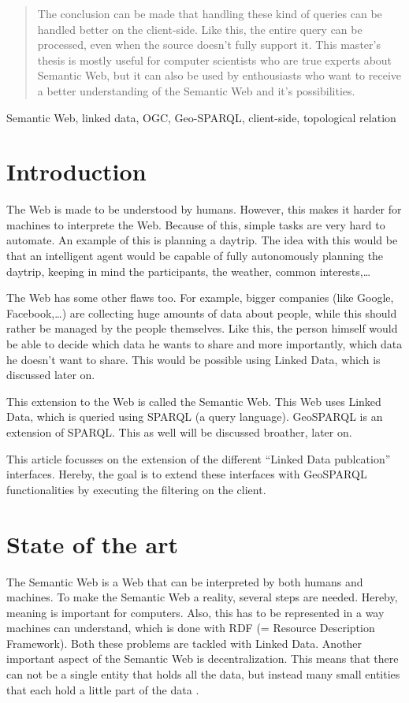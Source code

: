 \documentclass[twocolumn]{phdsymp} %
\begin{document}
\begin{abstract}
    The conclusion can be made that handling these kind of queries can be handled better on the client-side. Like this, the entire query can be processed, even when the source doesn't fully support it. This master's thesis is mostly useful for computer scientists who are true experts about Semantic Web, but it can also be used by enthousiasts who want to receive a better understanding of the Semantic Web and it's possibilities.
\end{abstract}

\begin{keywords}
    Semantic Web, linked data, OGC, Geo-SPARQL, client-side, topological relation
\end{keywords}

\section{Introduction}
The Web is made to be understood by humans. However, this makes it harder for machines to interprete the Web. Because of this, simple tasks are very hard to automate. An example of this is planning a daytrip. The idea with this would be that an intelligent agent would be capable of fully autonomously planning the daytrip, keeping in mind the participants, the weather, common interests,\dots

The Web has some other flaws too. For example, bigger companies (like Google, Facebook,\dots) are collecting huge amounts of data about people, while this should rather be managed by the people themselves. Like this, the person himself would be able to decide which data he wants to share and more importantly, which data he doesn't want to share. This would be possible using Linked Data, which is discussed later on.

This extension to the Web is called the Semantic Web. This Web uses Linked Data, which is queried using SPARQL (a query language). GeoSPARQL is an extension of SPARQL. This as well will be discussed broather, later on.

This article focusses on the extension of the different ``Linked Data publcation'' interfaces. Hereby, the goal is to extend these interfaces with GeoSPARQL functionalities by executing the filtering on the client.

\section{State of the art}
The Semantic Web is a Web that can be interpreted by both humans and machines. To make the Semantic Web a reality, several steps are needed. Hereby, meaning is important for computers. Also, this has to be represented in a way machines can understand, which is done with RDF (= Resource Description Framework). Both these problems are tackled with Linked Data. Another important aspect of the Semantic Web is decentralization. This means that there can not be a single entity that holds all the data, but instead many small entities that each hold a little part of the data \cite{berners2001semantic}. 
\end{document}
